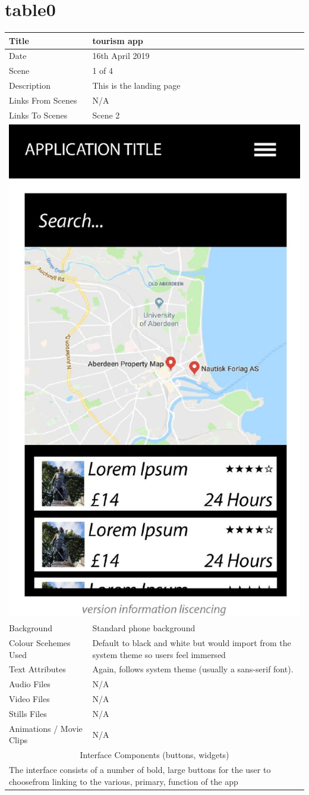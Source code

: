 \section{table0}
\hspace{-1cm}
	\centering
	\begin{tabular}{p{4cm}p{10cm}}
		\hline
		Title & tourism app \\
		\hline
		Date & 16th April 2019 \\
		\hline
		Scene & 1 of 4 \\
		\hline
		Description & This is the landing page \\
		\hline
		Links From Scenes & N/A \\
		\hline
		Links To Scenes & Scene 2 \\
		\hline
		\multicolumn{2}{c}{\includegraphics[width=0.5\linewidth]{images/screen0.jpg}} \\
		\hline
		Background & Standard phone background \\
		\hline
		Colour Scehemes Used & Default to black and white but would import from the system theme so users feel immersed \\
		\hline
		Text Attributes & Again, follows system theme (usually a sans-serif font). \\
		\hline
		Audio Files & N/A \\
		\hline
		Video Files & N/A \\
		\hline
		Stills Files & N/A \\
		\hline
		Animations / Movie Clips & N/A \\
		\hline
		\multicolumn{2}{c}{Interface Components (buttons, widgets)} \\
		\hline
		\multicolumn{2}{p{14cm}}{The interface consists of a number of bold, large buttons for the user to choosefrom linking to the various, primary, function of the app} \\
		\hline
	\end{tabular}
